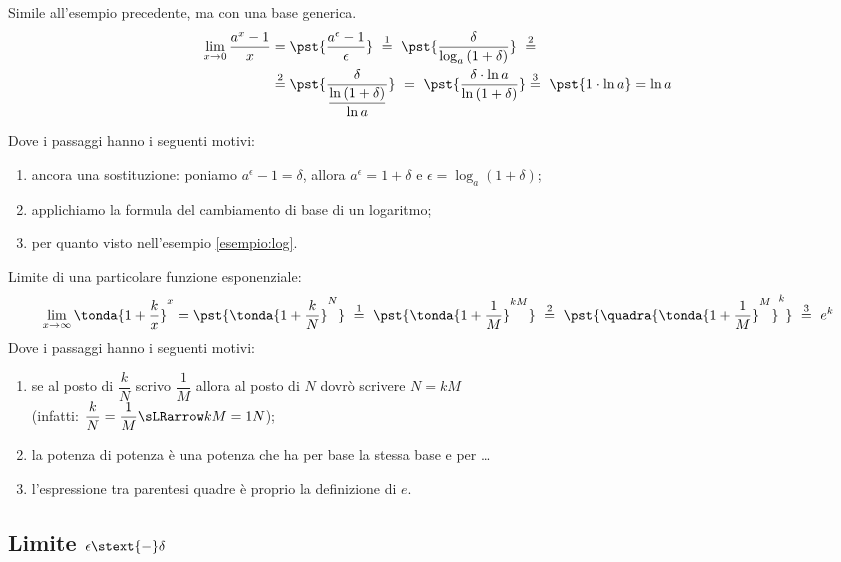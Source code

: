 \begin{esempio}
Simile all'esempio precedente, ma con una base generica.
\begin{align*}
\lim_{x \rightarrow 0} \dfrac{a^x-1}{x} &=
\pst{\dfrac{a^\epsilon-1}{\epsilon}}
~ \stackrel{1}{=} ~  
\pst{\dfrac{\delta}{\log_a{(1 + \delta)}}}~ \stackrel{2}{=}\\
&\stackrel{2}{=} 
\pst{\frac{\delta}{\dfrac{\ln{(1 + \delta)}}{\ln a}}} ~=~
\pst{\frac{\delta \cdot \ln a}{\ln{(1 + \delta)}}} %
\stackrel{3}{=} ~ 
\pst{1 \cdot \ln a}=\ln{a}
\end{align*}

Dove i passaggi hanno i seguenti motivi:
\begin{enumerate} [nosep]
 \item ancora una sostituzione: poniamo
\(a^\epsilon-1=\delta\), allora \(a^\epsilon= 1 + \delta\) e 
\(\epsilon=\log_a(1 + \delta)\);
 \item applichiamo la formula del cambiamento di base di un logaritmo; 
 \item per quanto visto nell'esempio \ref{esempio:log}.
\end{enumerate}
\end{esempio}

\begin{esempio}
Limite di una particolare funzione esponenziale:
\[
 \lim_{x \rightarrow \infty} \tonda{1+\dfrac{k}{x}}^x =
 \pst{\tonda{1+\dfrac{k}{N}}^N}
~ \stackrel{1}{=} ~  
\pst{\tonda{1+\dfrac{1}{M}}^{kM}}
~ \stackrel{2}{=} ~
\pst{\quadra{\tonda{1+\dfrac{1}{M}}^M}^k}
~ \stackrel{3}{=} ~ e^k
\]
Dove i passaggi hanno i seguenti motivi:
\begin{enumerate} [nosep]
 \item se al posto di \(\dfrac{k}{N}\) scrivo \(\dfrac{1}{M}\) 
allora al posto di \(N\) dovrò scrivere \(N=kM\)\\ 
(infatti: \(\dfrac{k}{N}=\dfrac{1}{M} \sLRarrow kM=1N\));
 \item la potenza di potenza è una potenza che ha per base la stessa base 
e per \dots
 \item l'espressione tra parentesi quadre è proprio la definizione di \(e\).
\end{enumerate}
\end{esempio}

\subsection{Limite \(\epsilon \stext{-} \delta\)}

